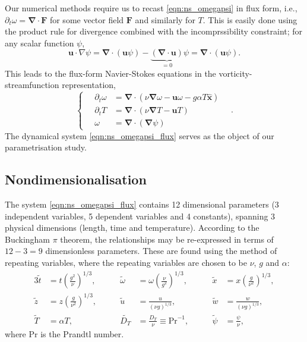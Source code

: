 \documentclass{article}
\renewcommand\vec{\bm}
\newcommand{\uvec}[1]{\vec{\hat{#1}}}
\newcommand{\grad}{\vec{\nabla}}
\newcommand{\prandtl}{\ensuremath{\mathrm{Pr}}}
\begin{document}
Our numerical methods require us to recast \autoref{eqn:ns_omegapsi} in flux
form, i.e., $\partial_t \omega = \grad \cdot \vec{F}$ for some vector field
$\vec{F}$ and similarly for $T$. This is easily done using the product
rule for divergence combined with the incomprssibility constraint;
for any scalar function $\psi$,
\[
    \vec{u} \cdot \nabla \psi = \grad \cdot (\vec{u} \psi)
        - \underbrace{(\grad \cdot \vec{u})}_{=0} \psi
        = \grad \cdot (\vec{u} \psi).
\]
This leads to the flux-form Navier-Stokes equations in the
vorticity-streamfunction representation,
\begin{equation} \label{eqn:ns_omegapsi_flux}
    \left\{ \quad
    \begin{aligned}
        \partial_t \omega &= \grad \cdot (\nu \grad \omega - \vec{u} \omega
            - g \alpha T \uvec{x}) \\
        \partial_t T &= \grad \cdot (\nu \grad T - \vec{u} T) \\
        \omega &= \grad \cdot (\grad \psi)
    \end{aligned}
    \right. \quad .
\end{equation}
The dynamical system \autoref{eqn:ns_omegapsi_flux} serves as the object of
our parametrisation study.

\subsection{Nondimensionalisation}
The system \autoref{eqn:ns_omegapsi_flux} contains 12 dimensional parameters
(3 independent variables, 5 dependent variables and 4 constants), spanning 3
physical dimensions (length, time and temperature). According to the
Buckingham $\pi$ theorem, the relationships may be re-expressed in terms of
$12-3=9$ dimensionless parameters. These are found using the method of
repeating variables, where the repeating variables are chosen to be
$\nu$, $g$ and $\alpha$:
\begin{alignat*}{3}
    \tilde{t} &= t \left( \frac{g^2}{\nu} \right)^{1/3},
        & \qquad \tilde{\omega} &= \omega \left( \frac{\nu}{g^2} \right)^{1/3},
        & \qquad \tilde{x} &= x \left( \frac{g}{\nu^2} \right)^{1/3}, \\
    \tilde{z} &= z \left( \frac{g}{\nu^2} \right)^{1/3},
        & \qquad \tilde{u} &= \frac{u}{(\nu g)^{1/3}},
        & \qquad \tilde{w} &= \frac{w}{(\nu g)^{1/3}}, \\
    \tilde{T} &= \alpha T,
        & \qquad \tilde{D_T} &= \frac{D_T}{\nu} \equiv \prandtl^{-1},
        & \qquad \tilde{\psi} &= \frac{\psi}{\nu},
\end{alignat*}
where $\prandtl$ is the Prandtl number.
\end{document}
